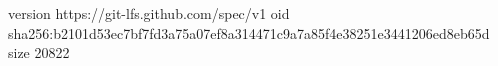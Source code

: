 version https://git-lfs.github.com/spec/v1
oid sha256:b2101d53ec7bf7fd3a75a07ef8a314471c9a7a85f4e38251e3441206ed8eb65d
size 20822
